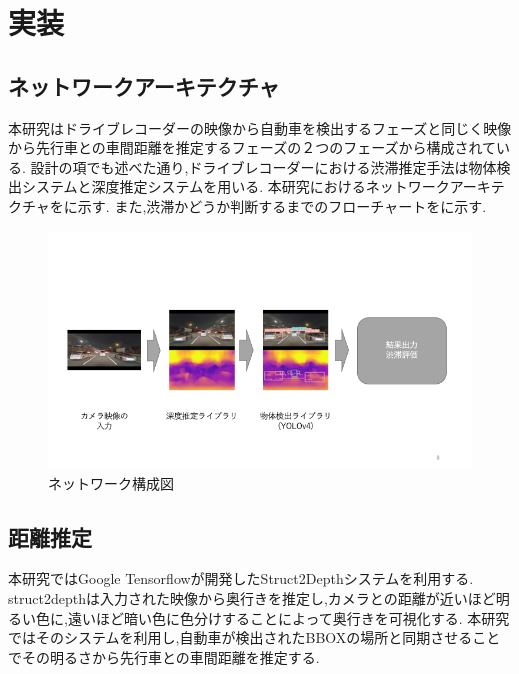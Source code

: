 \newpage
\section{実装}
\subsection{ネットワークアーキテクチャ}
本研究はドライブレコーダーの映像から自動車を検出するフェーズと同じく映像から先行車との車間距離を推定するフェーズの２つのフェーズから構成されている.
設計の項でも述べた通り,ドライブレコーダーにおける渋滞推定手法は物体検出システムと深度推定システムを用いる.
本研究におけるネットワークアーキテクチャをに示す.
また,渋滞かどうか判断するまでのフローチャートをに示す.

\begin{figure}[htbp]
  \begin{center}
    \includegraphics[width=12cm]{figs/system_net.png}
    \caption{ネットワーク構成図}
    \label{fig:system_arch}
  \end{center}
\end{figure}



\subsection{距離推定}
本研究ではGoogle Tensorflowが開発したStruct2Depthシステムを利用する.
struct2depthは入力された映像から奥行きを推定し,カメラとの距離が近いほど明るい色に,遠いほど暗い色に色分けすることによって奥行きを可視化する.
本研究ではそのシステムを利用し,自動車が検出されたBBOXの場所と同期させることでその明るさから先行車との車間距離を推定する.


